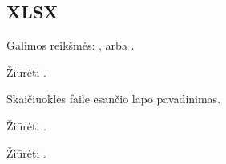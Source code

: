 \documentclass[letterpaper,10pt,lithuanian]{sphinxmanual}
\begin{document}
\subsection{XLSX}
\label{\detokenize{saltiniai:xlsx}}

\begin{fulllineitems}

\pysigstartsignatures
\pysigline
{}
\pysigstopsignatures
\sphinxAtStartPar
Galimos reikšmės: ,  arba .

\end{fulllineitems}



\begin{fulllineitems}

\pysigstartsignatures
\pysigline
{}
\pysigstopsignatures
\sphinxAtStartPar
Žiūrėti {\hyperref[\detokenize{formules:failai}]{}}.

\end{fulllineitems}



\begin{fulllineitems}

\pysigstartsignatures
\pysigline
{}
\pysigstopsignatures
\sphinxAtStartPar
Skaičiuoklės faile esančio lapo pavadinimas.

\end{fulllineitems}



\begin{fulllineitems}

\pysigstartsignatures
\pysigline
{}
\pysigstopsignatures
\sphinxAtStartPar
Žiūrėti {\hyperref[\detokenize{formules:stulpeliai-lenteleje}]{}}.

\end{fulllineitems}



\begin{fulllineitems}

\pysigstartsignatures
\pysigline
{}
\pysigstopsignatures
\sphinxAtStartPar
Žiūrėti {\hyperref[\detokenize{formules:stulpeliai-lenteleje}]{}}.

\end{fulllineitems}
\end{document}
